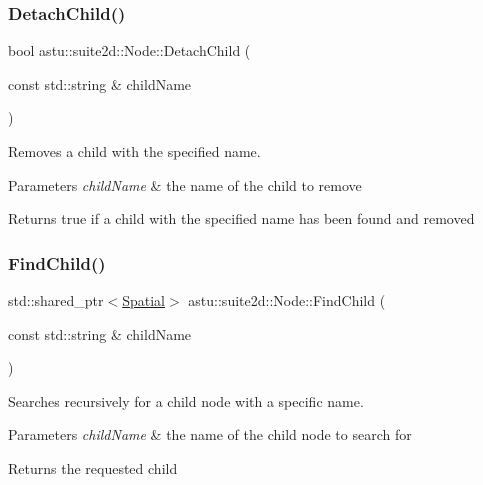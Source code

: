 \subsubsection{\texorpdfstring{Detach\+Child()}{DetachChild()}\hspace{0.1cm}{\footnotesize\ttfamily [2/2]}}
{\footnotesize\ttfamily bool astu\+::suite2d\+::\+Node\+::\+Detach\+Child (\begin{DoxyParamCaption}\item[{const std\+::string \&}]{child\+Name }\end{DoxyParamCaption})\hspace{0.3cm}{\ttfamily [inline]}}

Removes a child with the specified name.


\begin{DoxyParams}{Parameters}
{\em child\+Name} & the name of the child to remove \\
\hline
\end{DoxyParams}
\begin{DoxyReturn}{Returns}
{\ttfamily true} if a child with the specified name has been found and removed 
\end{DoxyReturn}
\mbox{\label{classastu_1_1suite2d_1_1Node_aab94cc89c131207f17a3d36295340780}} 
\subsubsection{\texorpdfstring{Find\+Child()}{FindChild()}}
{\footnotesize\ttfamily std\+::shared\+\_\+ptr$<$\hyperlink{classastu_1_1suite2d_1_1Spatial}{Spatial}$>$ astu\+::suite2d\+::\+Node\+::\+Find\+Child (\begin{DoxyParamCaption}\item[{const std\+::string \&}]{child\+Name }\end{DoxyParamCaption})}

Searches recursively for a child node with a specific name.


\begin{DoxyParams}{Parameters}
{\em child\+Name} & the name of the child node to search for \\
\hline
\end{DoxyParams}
\begin{DoxyReturn}{Returns}
the requested child 
\end{DoxyReturn}

